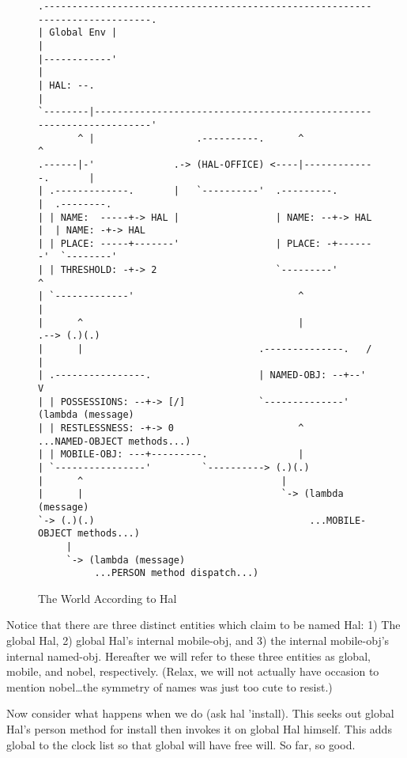 \begin{figure}[htb]
{\footnotesize
\begin{verbatim}
.------------------------------------------------------------------------------.
| Global Env |                                                                 |
|------------'                                                                 |
| HAL: --.                                                                     |
`--------|---------------------------------------------------------------------'
       ^ |                  .----------.      ^                     ^
.------|-'              .-> (HAL-OFFICE) <----|-------------.       |
| .-------------.       |   `----------'  .---------.       |  .--------.
| | NAME:  -----+-> HAL |                 | NAME: --+-> HAL |  | NAME: -+-> HAL
| | PLACE: -----+-------'                 | PLACE: -+-------'  `--------'
| | THRESHOLD: -+-> 2                     `---------'               ^
| `-------------'                             ^                     |
|      ^                                      |            .--> (.)(.)
|      |                               .--------------.   /      |
| .----------------.                   | NAMED-OBJ: --+--'       V
| | POSSESSIONS: --+-> [/]             `--------------'    (lambda (message)
| | RESTLESSNESS: -+-> 0                      ^             ...NAMED-OBJECT methods...)
| | MOBILE-OBJ: ---+---------.                |
| `----------------'         `----------> (.)(.)
|      ^                                   |
|      |                                   `-> (lambda (message)
`-> (.)(.)                                      ...MOBILE-OBJECT methods...)
     |
     `-> (lambda (message)
          ...PERSON method dispatch...)
\end{verbatim}
}
\caption{The World According to Hal}\label{fig:hal-world}
\end{figure}

Notice that there are three distinct entities which claim to be named Hal: 1)
The global Hal, 2) global Hal's internal {\cf mobile-obj}, and 3) the internal
{\cf mobile-obj}'s internal {\cf named-obj}. Hereafter we will refer to these
three entities as {\cf global}, {\cf mobile}, and {\cf nobel}, respectively.
(Relax, we will not actually have occasion to mention {\cf nobel}\ldots the
symmetry of names was just too cute to resist.)

Now consider what happens when we do {\cf (ask hal 'install)}.  This
seeks out global Hal's person method for {\cf install} then invokes it
on global Hal himself.  This adds {\cf global} to the clock list so
that {\cf global} will have free will.  So far, so good.

